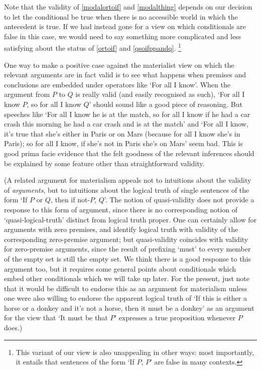 \documentclass[If.tex]{subfiles}
\begin{document}
Note that the validity of \ref{modalortoif} and \ref{modalthing} depends on our decision to let the conditional be true when there is no accessible world in which the antecedent is true. If we had instead gone for a view on which conditionals are false in this case, we would need to say something more complicated and less satisfying about the status of \ref{ortoif} and \ref{qsoifppandq}.%
\footnote{This variant of our view is also unappealing in other ways: most importantly, it entails that sentences of the form ‘If $P$, $P$’ are false in many contexts.}

One way to make a positive case against the materialist view on which the relevant arguments are in fact valid is to see what happens when premises and conclusions are embedded under operators like ‘For all I know’. When the argument from $P$ to $Q$ is really valid (and easily recognised as such), ‘For all I know $P$, so for all I know $Q$’ should sound like a good piece of reasoning. But speeches like ‘For all I know he is at the match, so for all I know if he had a car crash this morning he had a car crash and is at the match’ and ‘For all I know, it's true that she's either in Paris or on Mars (because for all I know she's in Paris); so for all I know, if she's not in Paris she's on Mars’ seem bad. This is good prima facie evidence that the felt goodness of the relevant inferences should be explained by some feature other than straightforward validity.

(A related argument for materialism appeals not to intuitions about the validity of \emph{arguments}, but to intuitions about the logical truth of single sentences of the form ‘If $P$ or $Q$, then if not-$P$, $Q$’. The notion of quasi-validity does not provide a response to this form of argument, since there is no corresponding notion of ‘quasi-logical-truth’ distinct from logical truth proper.  One can certainly allow for arguments with zero premises, and identify logical truth with validity of the corresponding zero-premise argument; but quasi-validity coincides with validity for zero-premise arguments, since the result of prefixing ‘must’ to every member of the empty set is still the empty set.  We think there is a good response to this argument too, but it requires some general points about conditionals which embed other conditionals which we will take up later.  
For the present, just note that it would be difficult to endorse this as an argument for materialism unless one were also willing to endorse the apparent logical truth of ‘If this is either a horse or a donkey and it's not a horse, then it must be a donkey’ as an argument for the view that ‘It must be that $P$’ expresses a true proposition whenever $P$ does.)
\end{document}
